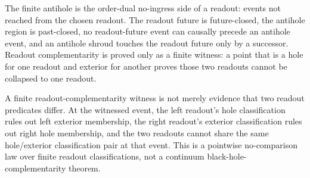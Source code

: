 \begin{theorem}\label{thm:antihole-readout-complementarity}\leanok{}
The finite antihole is the order-dual no-ingress side of a readout: events not
reached from the chosen readout.  The readout future is future-closed, the
antihole region is past-closed, no readout-future event can causally precede an
antihole event, and an antihole shroud touches the readout future only by a
successor.  Readout complementarity is proved only as a finite witness: a point
that is a hole for one readout and exterior for another proves those two
readouts cannot be collapsed to one readout.
\end{theorem}

\begin{theorem}\label{thm:finite-readout-no-comparison}\leanok{}
A finite readout-complementarity witness is not merely evidence that two
readout predicates differ.  At the witnessed event, the left readout's hole
classification rules out left exterior membership, the right readout's exterior
classification rules out right hole membership, and the two readouts cannot
share the same hole/exterior classification pair at that event.  This is a
pointwise no-comparison law over finite readout classifications, not a continuum
black-hole-complementarity theorem.
\end{theorem}

